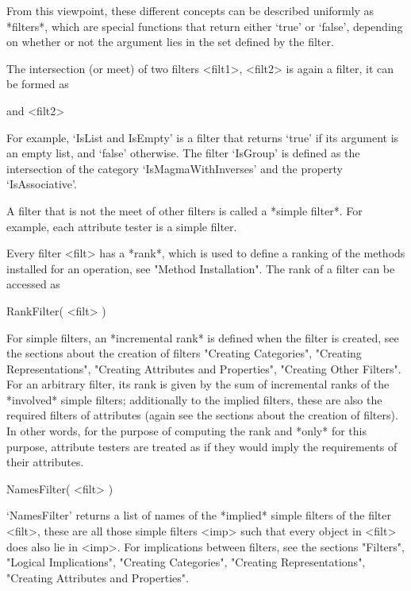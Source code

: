 {}From this viewpoint, these different concepts can be described
uniformly as *filters*,
which are special {\GAP} functions that return either `true' or `false',
depending on whether or not the argument lies in the set defined by the
filter.

The intersection (or meet) of two filters <filt1>, <filt2> is again a
filter,
it can be formed as

 and <filt2>

For example, `IsList and IsEmpty' is a filter that returns `true'
if its argument is an empty list, and `false' otherwise.
The filter `IsGroup' is defined as the intersection of the category
`IsMagmaWithInverses' and the property `IsAssociative'.

A filter that is not the meet of other filters
is called a *simple filter*.
For example, each attribute tester is a simple filter.

Every filter <filt> has a *rank*, which is used to define a ranking of
the methods installed for an operation, see "Method Installation".
The rank of a filter can be accessed as

\>RankFilter( <filt> )

For simple filters, an *incremental rank* is defined when the filter is
created, see the sections about the creation of filters
"Creating Categories", "Creating Representations",
"Creating Attributes and Properties", "Creating Other Filters".
For an arbitrary filter, its rank is given by the sum of incremental
ranks of the *involved* simple filters;
additionally to the implied filters, these are also the required filters
of attributes (again see the sections about the creation of filters).
In other words, for the purpose of computing the rank and *only* for this
purpose, attribute testers are treated as if they would imply the
requirements of their attributes.

\>NamesFilter( <filt> )

`NamesFilter' returns a list of names of the *implied* simple filters
of the filter <filt>, these are all those simple filters <imp> such that
every object in <filt> does also lie in <imp>.
For implications between filters, see the sections "Filters",
"Logical Implications", "Creating Categories",
"Creating Representations", "Creating Attributes and Properties".



